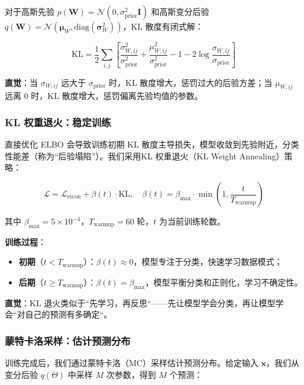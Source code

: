 对于高斯先验 $p(\mathbf{W}) = \mathcal{N}(0, \sigma_{\text{prior}}^2 \mathbf{I})$ 和高斯变分后验 $q(\mathbf{W}) = \mathcal{N}(\boldsymbol{\mu}_W, \text{diag}(\boldsymbol{\sigma}_W^2))$，KL 散度有闭式解：

\begin{equation}
\text{KL} = \frac{1}{2} \sum_{i,j} \left[ \frac{\sigma_{W,ij}^2}{\sigma_{\text{prior}}^2} + \frac{\mu_{W,ij}^2}{\sigma_{\text{prior}}^2} - 1 - 2\log\frac{\sigma_{W,ij}}{\sigma_{\text{prior}}} \right]
\end{equation}

\textbf{直觉}：当 $\sigma_{W,ij}$ 远大于 $\sigma_{\text{prior}}$ 时，KL 散度增大，惩罚过大的后验方差；当 $\mu_{W,ij}$ 远离 0 时，KL 散度增大，惩罚偏离先验均值的参数。

\subsubsection{KL 权重退火：稳定训练}

直接优化 ELBO 会导致训练初期 KL 散度主导损失，模型收敛到先验附近，分类性能差（称为``后验塌陷''）。我们采用KL 权重退火（KL Weight Annealing）策略：

\begin{equation}
\mathcal{L} = \mathcal{L}_{\text{recon}} + \beta(t) \cdot \text{KL}, \quad \beta(t) = \beta_{\max} \cdot \min\left(1, \frac{t}{T_{\text{warmup}}}\right)
\end{equation}

其中 $\beta_{\max}=5\times10^{-4}$，$T_{\text{warmup}}=60$ 轮，$t$ 为当前训练轮数。

\textbf{训练过程}：
\begin{itemize}
  \item \textbf{初期}（$t < T_{\text{warmup}}$）：$\beta(t) \approx 0$，模型专注于分类，快速学习数据模式；
  \item \textbf{后期}（$t \geq T_{\text{warmup}}$）：$\beta(t) = \beta_{\max}$，模型平衡分类和正则化，学习不确定性。
\end{itemize}

\textbf{直觉}：KL 退火类似于``先学习，再反思``——先让模型学会分类，再让模型学会``对自己的预测有多确定``。

\subsubsection{蒙特卡洛采样：估计预测分布}

训练完成后，我们通过蒙特卡洛（MC）采样估计预测分布。给定输入 $\mathbf{x}$，我们从变分后验 $q(\Theta)$ 中采样 $M$ 次参数，得到 $M$ 个预测：

